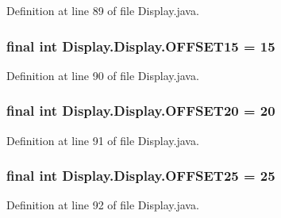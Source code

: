 Definition at line 89 of file Display.\+java.

\hypertarget{class_display_1_1_display_a3fb4f586318e61f3ad9d15d058ce15b8}{}
\subsubsection[{O\+F\+F\+S\+E\+T15}]{\setlength{\rightskip}{0pt plus 5cm}final int Display.\+Display.\+O\+F\+F\+S\+E\+T15 = 15\hspace{0.3cm}{\ttfamily [static]}}\label{class_display_1_1_display_a3fb4f586318e61f3ad9d15d058ce15b8}


Definition at line 90 of file Display.\+java.

\hypertarget{class_display_1_1_display_a2969279ab92fa68405072414fa62c987}{}
\subsubsection[{O\+F\+F\+S\+E\+T20}]{\setlength{\rightskip}{0pt plus 5cm}final int Display.\+Display.\+O\+F\+F\+S\+E\+T20 = 20\hspace{0.3cm}{\ttfamily [static]}}\label{class_display_1_1_display_a2969279ab92fa68405072414fa62c987}


Definition at line 91 of file Display.\+java.

\hypertarget{class_display_1_1_display_af6173975e03ce9913d8935d6f8040e5b}{}
\subsubsection[{O\+F\+F\+S\+E\+T25}]{\setlength{\rightskip}{0pt plus 5cm}final int Display.\+Display.\+O\+F\+F\+S\+E\+T25 = 25\hspace{0.3cm}{\ttfamily [static]}}\label{class_display_1_1_display_af6173975e03ce9913d8935d6f8040e5b}


Definition at line 92 of file Display.\+java.

\hypertarget{class_display_1_1_display_afbede7d7429e2ed899ae713864da8848}{}
